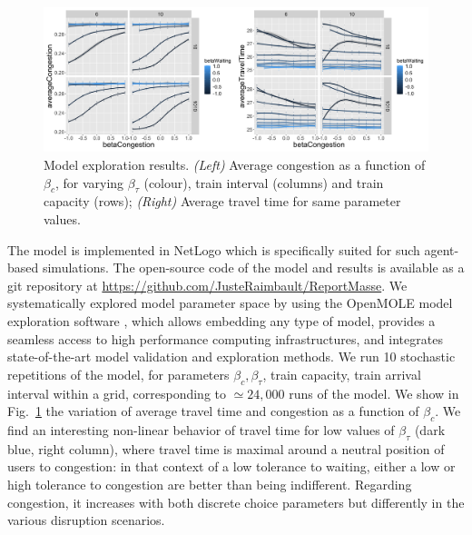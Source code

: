 \documentclass[3p,times,procedia]{elsarticle}
\begin{document}



\begin{figure}[t]\vspace*{4pt}
\centerline{\includegraphics[width=0.6\linewidth]{figures/Fig3.png}}
\caption{Model exploration results. \textit{(Left)} Average congestion as a function of $\beta_c$, for varying $\beta_{\tau}$ (colour), train interval (columns) and train capacity (rows); \textit{(Right)} Average travel time for same parameter values.\label{fig:fig3}}
\end{figure}





The model is implemented in NetLogo which is specifically suited for such agent-based simulations. The open-source code of the model and results is available as a git repository at \url{https://github.com/JusteRaimbault/ReportMasse}. We systematically explored model parameter space by using the OpenMOLE model exploration software \citep{reuillon2013openmole}, which allows embedding any type of model, provides a seamless access to high performance computing infrastructures, and integrates state-of-the-art model validation and exploration methods. We run 10 stochastic repetitions of the model, for parameters $\beta_c,\beta_{\tau}$, train capacity, train arrival interval within a grid, corresponding to $\simeq 24,000$ runs of the model. We show in Fig.~\ref{fig:fig3} the variation of average travel time and congestion as a function of $\beta_c$. We find an interesting non-linear behavior of travel time for low values of $\beta_{\tau}$ (dark blue, right column), where travel time is maximal around a neutral position of users to congestion: in that context of a low tolerance to waiting, either a low or high tolerance to congestion are better than being indifferent. Regarding congestion, it increases with both discrete choice parameters but differently in the various disruption scenarios.
\end{document}
